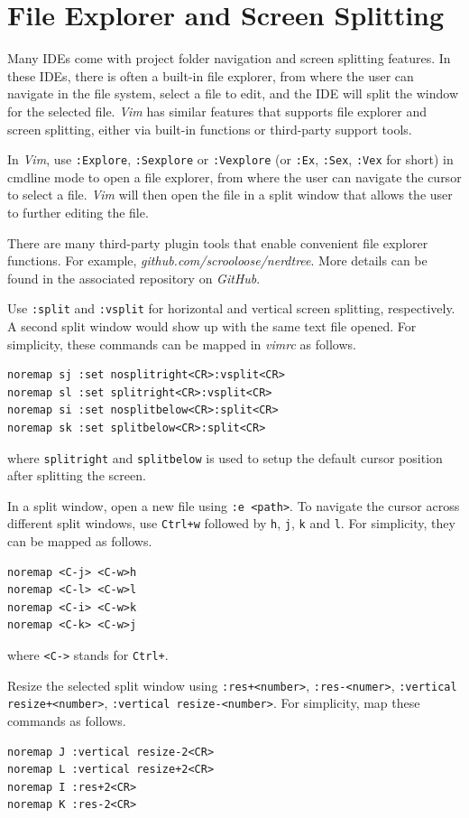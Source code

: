 \section{File Explorer and Screen Splitting}

Many IDEs come with project folder navigation and screen splitting features. In these IDEs, there is often a built-in file explorer, from where the user can navigate in the file system, select a file to edit, and the IDE will split the window for the selected file. \textit{Vim} has similar features that supports file explorer and screen splitting, either via built-in functions or third-party support tools.

In \textit{Vim}, use \verb|:Explore|, \verb|:Sexplore| or \verb|:Vexplore| (or \verb|:Ex|, \verb|:Sex|, \verb|:Vex| for short) in cmdline mode to open a file explorer, from where the user can navigate the cursor to select a file. \textit{Vim} will then open the file in a split window that allows the user to further editing the file.

There are many third-party plugin tools that enable convenient file explorer functions. For example, \textit{github.com/scrooloose/nerdtree}. More details can be found in the associated repository on \textit{GitHub}.

Use \verb|:split| and \verb|:vsplit| for horizontal and vertical screen splitting, respectively. A second split window would show up with the same text file opened. For simplicity, these commands can be mapped in \textit{vimrc} as follows.
\begin{lstlisting}
noremap sj :set nosplitright<CR>:vsplit<CR>
noremap sl :set splitright<CR>:vsplit<CR>
noremap si :set nosplitbelow<CR>:split<CR>
noremap sk :set splitbelow<CR>:split<CR>
\end{lstlisting}
where \verb|splitright| and \verb|splitbelow| is used to setup the default cursor position after splitting the screen.

In a split window, open a new file using \verb|:e <path>|. To navigate the cursor across different split windows, use \verb|Ctrl+w| followed by \verb|h|, \verb|j|, \verb|k| and \verb|l|. For simplicity, they can be mapped as follows.
\begin{lstlisting}
noremap <C-j> <C-w>h
noremap <C-l> <C-w>l
noremap <C-i> <C-w>k
noremap <C-k> <C-w>j
\end{lstlisting}
where \verb|<C->| stands for \verb|Ctrl+|.

Resize the selected split window using \verb|:res+<number>|, \verb|:res-<numer>|, \verb|:vertical resize+<number>|, \verb|:vertical resize-<number>|. For simplicity, map these commands as follows.
\begin{lstlisting}
noremap J :vertical resize-2<CR>
noremap L :vertical resize+2<CR>
noremap I :res+2<CR>
noremap K :res-2<CR>
\end{lstlisting}

